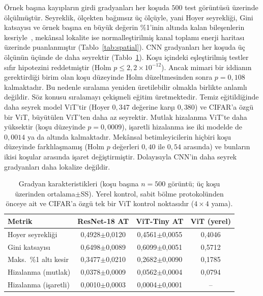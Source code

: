 Örnek başına kayıpların girdi gradyanları her koşuda $500$ test görüntüsü üzerinde ölçülmüştür. Seyreklik, ölçekten bağımsız üç ölçüyle, yani Hoyer seyrekliği, Gini katsayısı ve örnek başına en büyük değerin \%1'inin altında kalan bileşenlerin kesriyle~\cite{hurley2009comparing}, mekânsal lokalite ise normalleştirilmiş kanal toplamı enerji haritası üzerinde puanlanmıştır (Tablo~\ref{tab:spatial}). CNN gradyanları her koşuda üç ölçünün üçünde de daha seyrektir (Tablo~\ref{tab:gradient}). Koşu içindeki eşleştirilmiş testler sıfır hipotezini reddetmiştir (Holm $p \leq 2{,}2\times10^{-12}$). Ancak mimari bir iddianın gerektirdiği birim olan koşu düzeyinde Holm düzeltmesinden sonra $p = 0{,}108$ kalmaktadır. Bu nedenle sıralama yeniden üretilebilir olmakla birlikte anlamlı değildir. Söz konusu sıralamayı çekişmeli eğitim üretmektedir. Temiz eğitildiğinde daha seyrek model ViT'tir (Hoyer $0{,}347$ değerine karşı $0{,}380$) ve CIFAR'a özgü bir ViT, büyütülen ViT'ten daha az seyrektir. Mutlak hizalanma ViT'te daha yüksektir (koşu düzeyinde $p = 0{,}0009$), işaretli hizalanma ise iki modelde de $0{,}0014$ ya da altında kalmaktadır. Mekânsal betimleyicilerin hiçbiri koşu düzeyinde farklılaşmamış (Holm $p$ değerleri $0{,}40$ ile $0{,}54$ arasında) ve bunların ikisi koşular arasında işaret değiştirmiştir. Dolayısıyla CNN'in daha seyrek gradyanları daha lokalize değildir.

\begin{table}[!t]
\centering
\caption{Gradyan karakteristikleri (koşu başına $n=500$ görüntü; üç koşu üzerinden ortalama$\pm$SS). Yerel kontrol, sabit bölme protokolünden önceye ait ve CIFAR'a özgü tek bir ViT kontrol noktasıdır ($4\times4$ yama).}
\label{tab:gradient}
\footnotesize
\setlength{\tabcolsep}{2.5pt}
\begin{tabular}{lccc}
\toprule
\textbf{Metrik} & \textbf{ResNet-18 AT} & \textbf{ViT-Tiny AT} & \textbf{ViT (yerel)} \\
\midrule
Hoyer seyrekliği & 0,4928$\pm$0,0120 & 0,4561$\pm$0,0055 & 0,4046 \\
Gini katsayısı & 0,6498$\pm$0,0089 & 0,6099$\pm$0,0051 & 0,5712 \\
Maks.\ \%1 altı kesir & 0,3477$\pm$0,0210 & 0,2682$\pm$0,0090 & 0,1785 \\
Hizalanma (mutlak) & 0,0378$\pm$0,0009 & 0,0562$\pm$0,0004 & 0,0794 \\
Hizalanma (işaretli) & 0,0010$\pm$0,0003 & 0,0004$\pm$0,0001 & -- \\
\bottomrule
\end{tabular}
\end{table}

